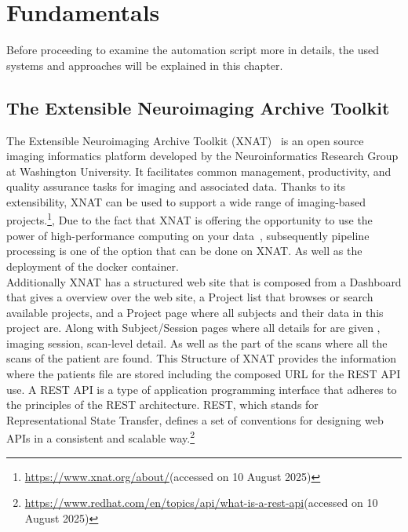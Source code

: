 
\chapter{Fundamentals}

Before proceeding to examine the automation script more in details, the used systems and approaches will be explained in this chapter.

\section{The Extensible Neuroimaging Archive Toolkit}
The Extensible Neuroimaging Archive Toolkit (XNAT)~\cite{marcus_extensible_2007} is an open source imaging informatics platform developed by the Neuroinformatics Research Group at Washington University. It facilitates common management, productivity, and quality assurance tasks for imaging and associated data. Thanks to its extensibility, XNAT can be used to support a wide range of imaging-based projects.\footnote{\url{https://www.xnat.org/about/}(accessed on 10 August 2025)}, Due to the fact that XNAT is offering the opportunity to use the power of high-performance computing on your data~\cite{zaschke_extending_2024}, 
subsequently pipeline processing is one of the option that can be done on XNAT. As well as the deployment of the docker container.
\\
Additionally XNAT has a structured web site that is composed from a Dashboard that gives a overview over the web site, a Project list that browses or search available projects, and a Project page where all subjects and their data in this project are. Along with Subject/Session pages where all details for are given , imaging session, scan-level detail.
As well as the part of the scans where all the scans of the patient are found. 
This Structure of XNAT provides the information where the patients file are stored including the composed URL for the REST API use. A REST API is a type of application programming interface that adheres to the principles of the REST architecture. REST, which stands for Representational State Transfer, defines a set of conventions for designing web APIs in a consistent and scalable way.\footnote{\url{https://www.redhat.com/en/topics/api/what-is-a-rest-api}(accessed on 10 August 2025)}
\\
